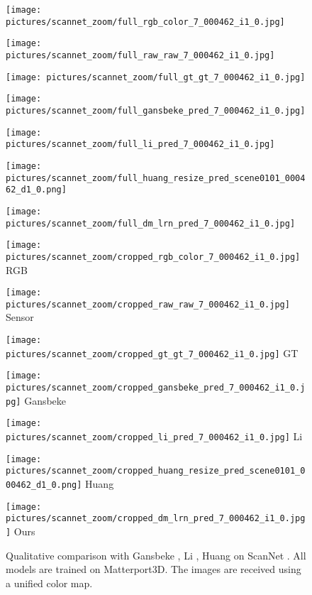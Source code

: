 \documentclass[final]{cvpr}
\begin{document}
\begin{figure*}[!t]
        \begin{multicols}{7}
            \texttt{[image: pictures/scannet\_zoom/full\_rgb\_color\_7\_000462\_i1\_0.jpg]}\par
            \texttt{[image: pictures/scannet\_zoom/full\_raw\_raw\_7\_000462\_i1\_0.jpg]}\par
            \texttt{[image: pictures/scannet\_zoom/full\_gt\_gt\_7\_000462\_i1\_0.jpg]}\par 
            \texttt{[image: pictures/scannet\_zoom/full\_gansbeke\_pred\_7\_000462\_i1\_0.jpg]}\par 
            \texttt{[image: pictures/scannet\_zoom/full\_li\_pred\_7\_000462\_i1\_0.jpg]}\par
            \texttt{[image: pictures/scannet\_zoom/full\_huang\_resize\_pred\_scene0101\_000462\_d1\_0.png]}\par 
            \texttt{[image: pictures/scannet\_zoom/full\_dm\_lrn\_pred\_7\_000462\_i1\_0.jpg]}\par 
        \end{multicols}
        \begin{multicols}{7}
            \texttt{[image: pictures/scannet\_zoom/cropped\_rgb\_color\_7\_000462\_i1\_0.jpg]} \centering \small{RGB}\par
            \texttt{[image: pictures/scannet\_zoom/cropped\_raw\_raw\_7\_000462\_i1\_0.jpg]} \centering \small{Sensor}\par
            \texttt{[image: pictures/scannet\_zoom/cropped\_gt\_gt\_7\_000462\_i1\_0.jpg]} \centering \small{GT}\par 
            \texttt{[image: pictures/scannet\_zoom/cropped\_gansbeke\_pred\_7\_000462\_i1\_0.jpg]}\centering \small{ Gansbeke \etal}\par 
            \texttt{[image: pictures/scannet\_zoom/cropped\_li\_pred\_7\_000462\_i1\_0.jpg]} \centering \small{ Li \etal}\par
            \texttt{[image: pictures/scannet\_zoom/cropped\_huang\_resize\_pred\_scene0101\_000462\_d1\_0.png]} \centering \small{ Huang \etal}\par 
            \texttt{[image: pictures/scannet\_zoom/cropped\_dm\_lrn\_pred\_7\_000462\_i1\_0.jpg]} \centering \small{ Ours}\par 
        \end{multicols}
        
        
        




    \caption{Qualitative comparison with Gansbeke \etal\cite{wvangansbeke_depth_2019}, Li \etal\cite{msg_chn}, Huang \etal\cite{Huang_2019} on ScanNet \cite{dai2017scannet}. All models are trained on Matterport3D. The images are received using a unified color map.}
    \label{fig:scannet_viz_test}
    \end{figure*}
    
\end{document}
